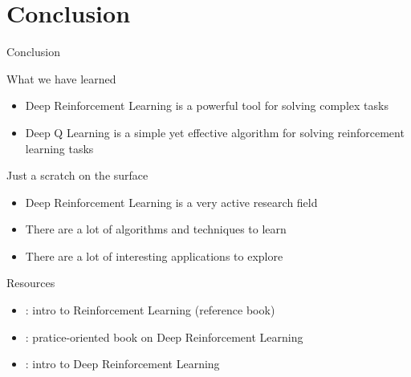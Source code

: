 \documentclass[presentation, 9pt]{beamer}\mode<presentation>{\usetheme{AMSBolognaFC}}
\begin{document}
\section{Conclusion}
\begin{frame}{Conclusion}
	\begin{block}{What we have learned}
		\begin{itemize}
			\item Deep Reinforcement Learning is a powerful tool for solving complex tasks
			\item Deep Q Learning is a simple yet effective algorithm for solving reinforcement learning tasks
		\end{itemize}
	\end{block}
	\begin{exampleblock}{Just a scratch on the surface}
		\begin{itemize}
			\item Deep Reinforcement Learning is a very active research field
			\item There are a lot of algorithms and techniques to learn
			\item There are a lot of interesting applications to explore
		\end{itemize}
	\end{exampleblock}
	\begin{block}{Resources}
		\begin{itemize}
			\item {}: intro to Reinforcement Learning (reference book)
			\item {}: pratice-oriented book on Deep Reinforcement Learning
			\item {}: intro to Deep Reinforcement Learning
		\end{itemize}
	\end{block}
\end{frame}
\section*{}

\frame{\titlepage}

\section*{\refname}

\begin{frame}{\refname}
	\tiny
	\nocite{*}
	\printbibliography
\end{frame}

\end{document}
